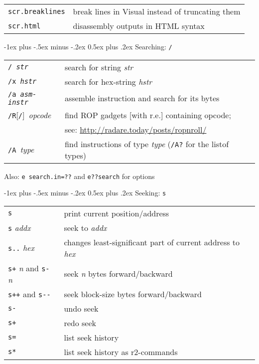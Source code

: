 \documentclass[a4paper,landscape]{article}
\makeatletter
\renewcommand{\section}{\@startsection{section}{1}{0mm}%
                                {-1ex plus -.5ex minus -.2ex}%
                                {0.5ex plus .2ex}%
                                {\normalfont\large\bfseries}}
\renewcommand{\subsubsection}{\@startsection{subsubsection}{3}{0mm}%
                                {-1ex plus -.5ex minus -.2ex}%
                                {1ex plus .2ex}%
                                {\normalfont\small\bfseries}}
\makeatother
\begin{document}
\begin{multicols*}{3}
\begin{tabular}{@{}ll@{}}
\texttt{scr.breaklines} & break lines in Visual instead of truncating them \\
\texttt{scr.html} & disassembly outputs in HTML syntax \\
\end{tabular}

\section{Searching: \texttt{/}}
\begin{tabular}{@{}ll@{}}
\texttt{/ \textit{str}} & search for string \textit{str} \\
\texttt{/x \textit{hstr}} & search for hex-string \textit{hstr} \\
\texttt{/a \textit{asm-instr}} & assemble instruction and search for its bytes \\
\texttt{/R}[\texttt{/}]\ \textit{opcode} & find ROP gadgets [with r.e.] containing opcode; \\ & see: \url{http://radare.today/posts/ropnroll/} \\
\texttt{/A }\textit{type} & find instructions of type \textit{type} (\texttt{/A?} for the listof types) \\
\end{tabular}

Also: \texttt{e search.in=??} and \texttt{e??search} for options

\section{Seeking: \texttt{s}}
\begin{tabular}{@{}ll@{}}
\texttt{s} & print current position/address \\
\texttt{s} \textit{addx} & seek to \textit{addx} \\
\texttt{s..} \textit{hex} & changes least-significant part of current address to \textit{hex}\\
\texttt{s+} \textit{n} and \texttt{s-} \textit{n} & seek \textit{n} bytes forward/backward \\
\texttt{s++} and \texttt{s-{}-} & seek block-size bytes forward/backward \\
\texttt{s-} & undo seek \\
\texttt{s+} & redo seek \\
\texttt{s=} & list seek history \\
\texttt{s*} & list seek history as r2-commands \\
\end{tabular}


\end{multicols*}
\end{document}
